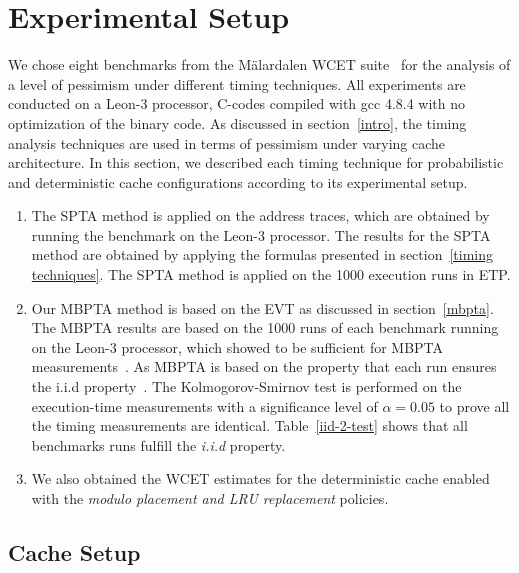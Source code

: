 \section{Experimental Setup}
\label{exp}
We chose eight benchmarks from the M{\"a}lardalen WCET suite~\cite{mrtc:bench} for the analysis of a level of pessimism  under different timing techniques. %
All experiments are conducted on a Leon-3 processor, C-codes compiled with gcc 4.8.4 with no optimization of the binary code. As discussed in section~\ref{intro}, the timing analysis techniques are used in terms of pessimism under varying cache architecture. In this section, we described each timing technique for probabilistic and deterministic cache configurations according to its experimental setup.

\begin{enumerate}
 
\item {The SPTA method is applied on the address traces, which are obtained by running the benchmark on the Leon-3 processor. The results for the SPTA method are obtained by applying the formulas presented in section~\ref{timing techniques}. The SPTA method is applied on the 1000 execution runs in ETP}.
\item {Our MBPTA method is based on the EVT as discussed in section~\ref{mbpta}. The MBPTA results are based on the 1000 runs of each benchmark running on the Leon-3 processor, which showed to be sufficient for MBPTA measurements~\cite{cazorla2013upper}. As MBPTA is based on the property that each run ensures the i.i.d property~\cite{cucu2012measurement}. The Kolmogorov-Smirnov test is performed on the execution-time measurements with a significance level of $\alpha= 0.05$ to prove all the timing measurements are identical}. Table~\ref{iid-2-test} shows that all benchmarks runs fulfill the \textit{i.i.d} property.

\item {We also obtained the WCET estimates for the deterministic cache enabled with the \textit{modulo placement and LRU replacement} policies.}


\end{enumerate}
\subsection{Cache Setup}

